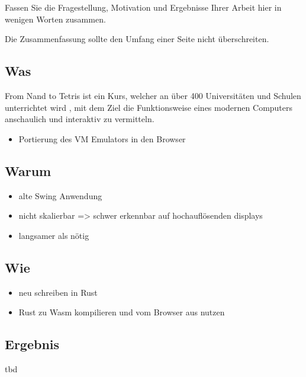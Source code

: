 Fassen Sie die Fragestellung, Motivation und Ergebnisse Ihrer Arbeit
hier in wenigen Worten zusammen.

Die Zusammenfassung sollte den Umfang einer Seite nicht überschreiten.

\subsection{Was}
From Nand to Tetris ist ein Kurs, welcher an über 400 Universitäten und Schulen unterrichtet wird \cite{nand2tetris.org}, mit dem Ziel die Funktionsweise eines modernen Computers anschaulich und interaktiv zu vermitteln.

\begin{itemize}
\item Portierung des VM Emulators in den Browser
\end{itemize}

\subsection{Warum}
\begin{itemize}
\item alte Swing Anwendung
\item nicht skalierbar => schwer erkennbar auf hochauflösenden displays
\item langsamer als nötig
\end{itemize}

\subsection{Wie}
\begin{itemize}
\item neu schreiben in Rust
\item Rust zu Wasm kompilieren und vom Browser aus nutzen
\end{itemize}

\subsection{Ergebnis}
tbd
